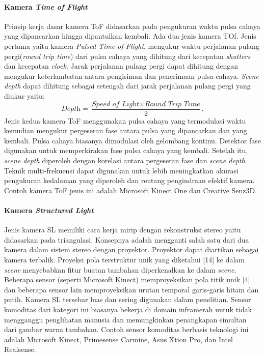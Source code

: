     \paragraph{Kamera \textit{Time of Flight}}
    \label{subsec: kamera_tof}
    Prinsip kerja dasar kamera ToF didasarkan pada pengukuran waktu pulsa cahaya yang dipancarkan hingga dipantulkan kembali\cite{b8}.
    Ada dua jenis kamera TOf. Jenis pertama yaitu kamera \textit{Pulsed Time-of-Flight}, mengukur waktu perjalanan pulang pergi(\textit{round trip time}) dari pulsa cahaya yang dihitung dari kecepatan \textit{shutters} dan kecepatan \textit{clock}. Jarak perjalanan pulang pergi dapat dihitung dengan mengukur keterlambatan antara pengiriman dan penerimaan pulsa cahaya. \textit{Scene depth} dapat dihitung sebagai setengah dari jarak perjalanan pulang pergi yang diukur yaitu:
    \begin{equation}
        \textit{Depth} = \frac{\textit{Speed\ of\ Light}\times \textit{Round\ Trip\ Time}}{2}.
    \end{equation}
    Jenis kedua kamera ToF menggunakan pulsa cahaya yang termodulasi waktu kemudian mengukur pergeseran fase antara pulsa yang dipancarkan dan yang kembali. Pulsa cahaya biasanya dimodulasi oleh gelombang kontinu. Detektor fase digunakan untuk memperkirakan fase pulsa cahaya yang kembali. Setelah itu, \textit{scene depth} diperoleh dengan korelasi antara pergeseran fase dan \textit{scene depth}. Teknik multi-frekuensi dapat digunakan untuk lebih meningkatkan akurasi pengukuran kedalaman yang diperoleh dan rentang pengindraan efektif kamera. Contoh kamera ToF jenis ini adalah Microsoft Kinect One dan Creative Senz3D.

    \paragraph{Kamera \textit{Structured Light}}
    \label{subsec: kamera_sl}
    Jenis kamera SL memiliki cara kerja mirip dengan rekonstruksi stereo yaitu didasarkan pada triangulasi. Konsepnya adalah mengganti salah satu dari dua kamera dalam sistem stereo dengan proyektor. Proyektor dapat diartikan sebagai kamera terbalik. Proyeksi pola terstruktur unik yang diketahui [14] ke dalam \textit{scene} menyebabkan fitur buatan tambahan diperkenalkan ke dalam \textit{scene}. Beberapa sensor (seperti Microsoft Kinect) memproyeksikan pola titik unik [4] dan beberapa sensor lain memproyeksikan urutan temporal garis-garis hitam dan putih. Kamera SL tersebar luas dan sering digunakan dalam penelitian. Sensor komoditas dari kategori ini biasanya bekerja di domain inframerah untuk tidak mengganggu penglihatan manusia dan memungkinkan penangkapan simultan dari gambar warna tambahan. Contoh sensor komoditas berbasis teknologi ini adalah Microsoft Kinect, Primesense Carmine, Asus Xtion Pro, dan Intel Realsense.

